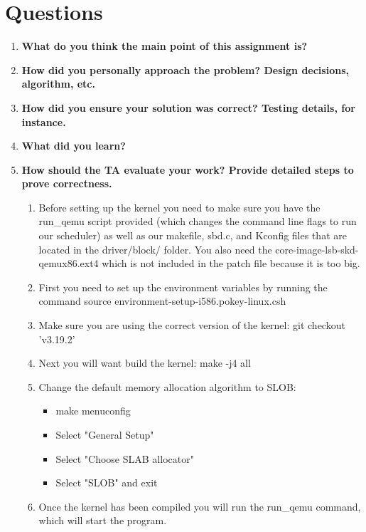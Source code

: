 \documentclass[onecolumn, draftclsnofoot,10pt, compsoc]{IEEEtran}
\begin{document}
\section{Questions}
\begin{enumerate}
\item \textbf{What do you think the main point of this assignment is?}
\\	

\item \textbf{How did you personally approach the problem? Design decisions, algorithm, etc.}
\\
\item \textbf{How did you ensure your solution was correct? Testing details, for instance.}
\\   

\item \textbf{What did you learn?}
\\ 

\item \textbf{How should the TA evaluate your work? Provide detailed steps to prove correctness.}
\begin{enumerate}
	\item Before setting up the kernel you need to make sure you have the run\_qemu script provided (which changes the command line flags to run our scheduler) as well as our makefile, sbd.c, and Kconfig files that are located in the driver/block/ folder. You also need the core-image-lsb-skd-qemux86.ext4 which is not included in the patch file because it is too big.
    
	\item First you need to set up the environment variables by running the command source environment-setup-i586.pokey-linux.csh
    
    \item Make sure you are using the correct version of the kernel: git checkout 'v3.19.2'
    \item Next you will want build the kernel: make -j4 all
    \item Change the default memory allocation algorithm to SLOB:
    	\begin{itemize}
		\item make menuconfig
        \item Select "General Setup"
        \item Select "Choose SLAB allocator"
        \item Select "SLOB" and exit
        \end{itemize}
    \item Once the kernel has been compiled you will run the run\_qemu command, which will start the program.
 
	\end{enumerate}
\end{enumerate}
\end{document}
